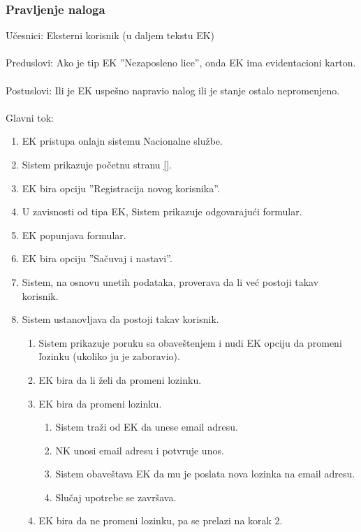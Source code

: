 \subsubsection{Pravljenje naloga}
\label{su: pravljenje naloga}

\noindent U\v cesnici: Eksterni korisnik (u daljem tekstu EK)
\\
\\ Preduslovi: Ako je tip EK ''Nezaposleno lice'', onda EK ima evidentacioni karton.
\\
\\ Postuslovi: Ili je EK uspe\v sno napravio nalog ili je stanje ostalo nepromenjeno.
\\ 
\\ Glavni tok:
\begin{enumerate}
	\item EK pristupa onlajn sistemu Nacionalne slu\v zbe.
	\item Sistem prikazuje po\v cetnu stranu \ref{}.
	\item EK bira opciju ''Registracija novog korisnika''.
	\item U zavisnosti od tipa EK, Sistem prikazuje odgovaraju\' ci formular.
	\item EK popunjava formular.
	\item EK bira opciju ''Sa\v cuvaj i nastavi''.
	\item Sistem, na osnovu unetih podataka, proverava da li ve\'c postoji takav korisnik.
	\item Sistem ustanovljava da postoji takav korisnik.
	\begin{enumerate}
		\item Sistem prikazuje poruku sa obave\v stenjem i nudi EK opciju da promeni \v lozinku (ukoliko ju je zaboravio).
		\item EK bira da li \v zeli da promeni lozinku.
		\item EK bira da promeni lozinku.
		\begin{enumerate}
			\item Sistem tra\v zi od EK da unese email adresu.
			\item NK unosi email adresu i potvr\dj uje unos.
			\item Sistem obave\v stava EK da mu je poslata nova lozinka na email adresu.
			\item Slu\v caj upotrebe se zavr\v sava.
		\end{enumerate}
		\item EK bira da ne promeni lozinku, pa se prelazi na korak 2.
	\end{enumerate}

\end{enumerate}

